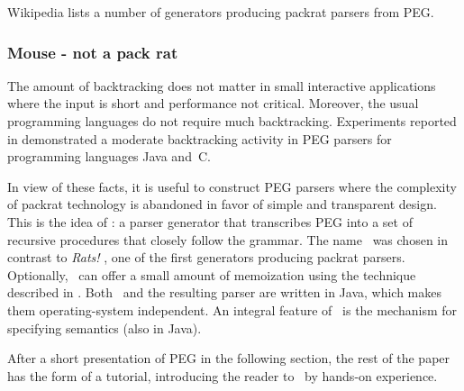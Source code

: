 Wikipedia \cite{Wiki:Rats} lists a number of generators  
producing packrat parsers from PEG.

\subsubsection*{Mouse - not a pack rat}

The amount of backtracking does not matter 
in small interactive applications
where the input is short and performance not critical.
Moreover, the usual programming languages
do not require much backtracking.
%
Experiments reported in \cite{Redz:2007:FI,Redz:2008:FI}
demonstrated a moderate backtracking activity  
in PEG parsers for programming languages Java and~C.

In view of these facts,
it is useful to construct PEG parsers
where the complexity of packrat technology is abandoned in favor
of simple and transparent design.
This is the idea of \Mouse:
a parser generator that transcribes
PEG into a set of recursive procedures that closely follow the grammar.
The name \Mouse\ was chosen in contrast to \textsl{Rats!} \cite{Grimm:2004}, 
one of the first generators producing packrat parsers.
Optionally, \Mouse\ can offer a small amount of memoization using the technique
described in \cite{Redz:2007:FI}.
Both \Mouse\ and the resulting parser are written in Java,
which makes them operating-system independent.
%
An integral feature of \Mouse\ is the mechanism for specifying
semantics (also in Java). 

\medskip
After a short presentation of PEG in the following section,
the rest of the paper has the form of a tutorial,
introducing the reader to \Mouse\ by hands-on experience.
